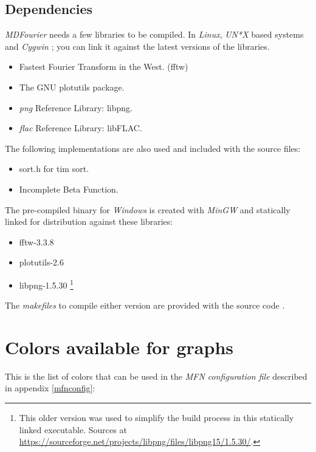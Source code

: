 \documentclass[10pt,a4paper]{report}
\newcommand{\ac}[1]{\textit{\acrshort{#1}}}
\begin{document}
\begin{appendices}
\section{Dependencies}

\textit{MDFourier} needs a few libraries to be compiled. In \textit{Linux}, \textit{UN*X} based systems and \textit{Cygwin} \cite{cygwin}; you can link it against the latest versions of the libraries. 

\begin{itemize}
	\item Fastest Fourier Transform in the West. (fftw) \cite{fftw}
	\item The GNU plotutils package. \cite{libplot}
	\item \ac{png} Reference Library: libpng. \cite{libpng}
	\item \ac{flac} Reference Library: libFLAC. \cite{libflac}
\end{itemize}

The following implementations are also used and included with the source files:

\begin{itemize}
	\item sort.h for tim sort. \cite{sort}
	\item Incomplete Beta Function. \cite{betafunction}
\end{itemize}

The pre-compiled binary for \textit{Windows} is created with \textit{MinGW}\cite{mingw} and statically linked for distribution against these libraries:

\begin{itemize}
	\item fftw-3.3.8 \cite{fftw}
	\item plotutils-2.6 \cite{libplot}
	\item libpng-1.5.30 \footnote{This older version was used to simplify the build process in this statically linked executable. Sources at \url{https://sourceforge.net/projects/libpng/files/libpng15/1.5.30/}.}
\end{itemize}

The \textit{makefiles} to compile either version are provided with the source code \cite{sourcecode}.

\chapter{Colors available for graphs}
\label{availablecolors}

This is the list of colors that can be used in the \textit{MFN configuration file} described in appendix \ref{mfnconfig}: 


\end{appendices}
\end{document}
